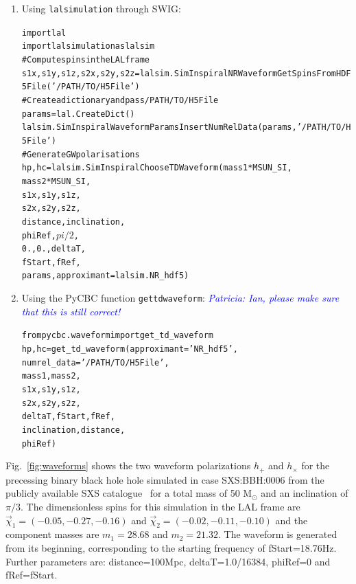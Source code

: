 \documentclass[11pt,tightenlines,article,amssymb,amsmath,amsfonts,superscriptaddress,nofootinbib]{revtex4}
\newcommand{\patricia}[1]{\textcolor{blue}{\textit{Patricia: #1}}}
\begin{document}
\begin{enumerate}

\item Using \texttt{lalsimulation} through SWIG:
\begin{alltt}
import lal
import lalsimulation as lalsim
# Compute spins in the LAL frame
s1x, s1y, s1z, s2x, s2y, s2z = \newline lalsim.SimInspiralNRWaveformGetSpinsFromHDF5File('/PATH/TO/H5File')
# Create a dictionary and pass /PATH/TO/H5File
params = lal.CreateDict()
lalsim.SimInspiralWaveformParamsInsertNumRelData(params, '/PATH/TO/H5File')
# Generate GW polarisations 
hp, hc = lalsim.SimInspiralChooseTDWaveform(mass1 * MSUN_SI, 
	              mass2 * MSUN_SI,
              s1x, s1y, s1z,
              s2x, s2y, s2z, 
              distance, inclination,
              phiRef, $pi/2$,
              0., 0., deltaT, 
              fStart, fRef,
              params, approximant=lalsim.NR_hdf5)
\end{alltt}

\item Using the PyCBC function \texttt{get\textunderscore td\textunderscore waveform}:
\patricia{Ian, please make sure that this is still correct!}
\begin{alltt}
from pycbc.waveform import get_td_waveform 
hp, hc = get_td_waveform(approximant='NR_hdf5', 
                         numrel_data='/PATH/TO/H5File',
                         mass1, mass2,
                         s1x, s1y, s1z,
                         s2x, s2y, s2z, 
                         deltaT, fStart, fRef,
                         inclination, distance, 
                         phiRef)
\end{alltt}
\end{enumerate}
Fig.~\ref{fig:waveforms} shows the two waveform polarizations $h_+$ and $h_{\times}$ for the precessing binary black hole hole simulated in case 
SXS:BBH:0006 from the publicly available SXS catalogue~\cite{Mroue:2013xna} for a total mass of 50 $\mathrm{M}_\odot$ and an inclination of $\pi/3$. The dimensionless spins for this simulation in the LAL frame are 
$\vec{\chi}_1=(-0.05, -0.27, -0.16)$ and $\vec{\chi}_2=(-0.02, -0.11, -0.10)$ and the component masses are $m_1=28.68$ and $m_2=21.32$. The waveform is generated from its beginning, corresponding to the starting frequency of fStart=18.76Hz.
Further parameters are: distance=100Mpc, deltaT=1.0/16384, phiRef=0 and fRef=fStart.
\end{document}
